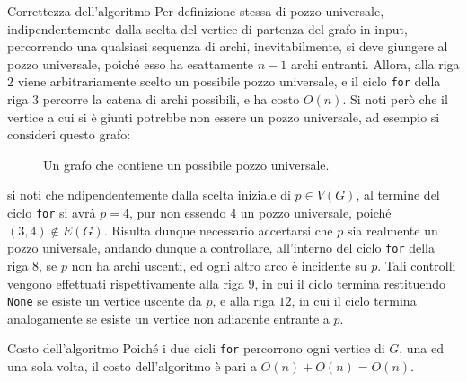 \documentclass[a4paper, 12pt]{report}
\begin{document}
    \begin{framedobs}{Correttezza dell'algoritmo}
        Per definizione stessa di pozzo universale, indipendentemente dalla scelta del vertice di partenza del grafo in input, percorrendo una qualsiasi sequenza di archi, inevitabilmente, si deve giungere al pozzo universale, poiché esso ha esattamente $n - 1$ archi entranti. Allora, alla riga $2$ viene arbitrariamente scelto un possibile pozzo universale, e il ciclo \texttt{for} della riga $3$ percorre la catena di archi possibili, e ha costo $O(n)$. Si noti però che il vertice a cui si è giunti potrebbe non essere un pozzo universale, ad esempio si consideri questo grafo:

        \begin{figure}[H]
            \centering
            \caption{Un grafo che contiene un possibile pozzo universale.}
        \end{figure}

        si noti che ndipendentemente dalla scelta iniziale di $p \in V(G)$, al termine del ciclo \texttt{for} si avrà $p = 4$, pur non essendo $4$ un pozzo universale, poiché $(3, 4) \notin E(G)$. Risulta dunque necessario accertarsi che $p$ sia realmente un pozzo universale, andando dunque a controllare, all'interno del ciclo \texttt{for} della riga $8$, se $p$ non ha archi uscenti, ed ogni altro arco è incidente su $p$. Tali controlli vengono effettuati rispettivamente alla riga $9$, in cui il ciclo termina restituendo \texttt{None} se esiste un vertice uscente da $p$, e alla riga $12$, in cui il ciclo termina analogamente se esiste un vertice non adiacente entrante a $p$.
    \end{framedobs}

    \begin{framedobs}{Costo dell'algoritmo}
        Poiché i due cicli \texttt{for} percorrono ogni vertice di $G$, una ed una sola volta, il costo dell'algoritmo è pari a $O(n) + O(n) = O(n)$.
    \end{framedobs}
\end{document}
